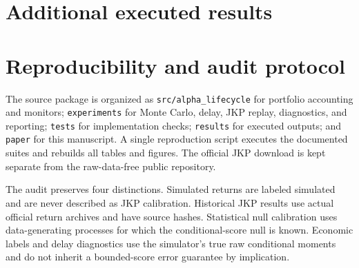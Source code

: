 \section{Additional executed results}\label{app:results}
\begin{table}[htbp]\centering\small
\caption{JKP reference paired-block intervals. Utility differences are annualized and multiplied by $10^4$. Circular 12-month blocks, 2,000 resamples. These are descriptive replay intervals, not anytime-valid confidence sequences.}

\end{table}
\begin{table}[htbp]\centering\scriptsize
\caption{Dependence stress tests. Utility gain over always on and its Monte Carlo standard error, both multiplied by $10^4$; 100 paths per design.}

\end{table}
\begin{table}[htbp]\centering\small
\caption{Scaling diagnostic for correlation revival. Utility differences and MC standard errors are multiplied by $10^4$; 30 paths per strategy count. This is not a global-oracle regret comparison.}

\end{table}
\begin{table}[htbp]\centering\scriptsize
\caption{Exploratory JKP book-architecture checks added after the reference replay. Utility gain is relative to always on within each design. All results, including zero certified switches, are retained.}
\resizebox{\linewidth}{!}{}
\end{table}
\clearpage
\section{Reproducibility and audit protocol}\label{app:reproduce}
The source package is organized as \texttt{src/alpha\_lifecycle} for portfolio accounting and monitors; \texttt{experiments} for Monte Carlo, delay, JKP replay, diagnostics, and reporting; \texttt{tests} for implementation checks; \texttt{results} for executed outputs; and \texttt{paper} for this manuscript. A single reproduction script executes the documented suites and rebuilds all tables and figures. The official JKP download is kept separate from the raw-data-free public repository.

The audit preserves four distinctions. Simulated returns are labeled simulated and are never described as JKP calibration. Historical JKP results use actual official return archives and have source hashes. Statistical null calibration uses data-generating processes for which the conditional-score null is known. Economic labels and delay diagnostics use the simulator's true raw conditional moments and do not inherit a bounded-score error guarantee by implication.


